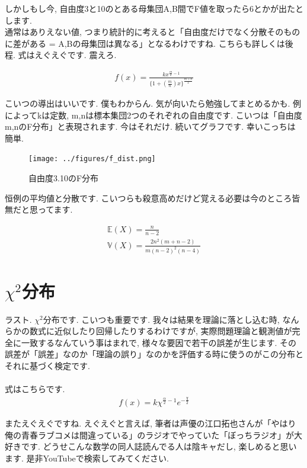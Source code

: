\documentclass[11pt,a4paper,uplatex]{ujreport} 	%
\begin{document}
しかしもし今, 自由度3と10のとある母集団A,B間でF値を取ったら6とかが出たとします. \\

通常はありえない値, つまり統計的に考えると「自由度だけでなく分散そのものに差がある = A,Bの母集団は異なる」となるわけですね. こちらも詳しくは後程. 式はえぐえぐです. 震えろ.

\begin{align}
f(x) = \frac{kx^{\frac{m}{2}-1}}{\{1 + (\frac{m}{n})x\}^{\frac{m+n}{2}}}
\end{align}

こいつの導出はいいです. 僕もわからん. 気が向いたら勉強してまとめるかも. 例によってkは定数, m,nは標本集団2つのそれぞれの自由度です. こいつは「自由度m,nのF分布」と表現されます. 今はそれだけ. 続いてグラフです. 幸いこっちは簡単.

\begin{figure}[H]
\label{im:f_dist}
  \centering
  \texttt{[image: ../figures/f\_dist.png]}
  \caption{自由度3.10のF分布}
\end{figure}

恒例の平均値と分散です. こいつらも殺意高めだけど覚える必要は今のところ皆無だと思ってます.

\begin{align}
\mathbb{E}(X) = \frac{n}{n-2}\\
\mathbb{V}(X) = \frac{2n^2 (m+n-2)}{m(n-2)^2(n-4)}
\end{align}

\section{$\chi^2$分布}
ラスト. $\chi^2$分布です. こいつも重要です. 我々は結果を理論に落とし込む時, なんらかの数式に近似したり回帰したりするわけですが, 実際問題理論と観測値が完全に一致するなんていう事はまれで, 様々な要因で若干の誤差が生じます. その誤差が「誤差」なのか「理論の誤り」なのかを評価する時に使うのがこの分布とそれに基づく検定です. \\
\\
式はこちらです. 
\begin{align}
f(x) = k\chi^{\frac{\alpha}{2}-1}e^{-\frac{\chi}{2}}
\end{align}

またえぐえぐですね. えぐえぐと言えば, 筆者は声優の江口拓也さんが「やはり俺の青春ラブコメは間違っている」のラジオでやっていた「ぼっちラジオ」が大好きです. どうせこんな数学の同人誌読んでる人は陰キャだし, 楽しめると思います. 是非YouTubeで検索してみてください.\\
\\
\end{document}
